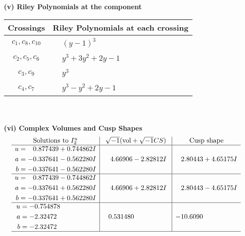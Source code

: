 \documentclass[1p]{elsarticle_modified}
\theoremstyle{definition}
\newcommand{\I}{\sqrt{-1}}
\begin{document}
\newpage\renewcommand{\arraystretch}{1}
\flushleft \textbf{(v) Riley Polynomials at the component}\newline \\
\begin{tabular}{m{50pt}|m{274pt}}
Crossings & \hspace{64pt}Riley Polynomials at each crossing \\
\hline $$\begin{aligned}c_{1},c_{8},c_{10}\end{aligned}$$&$\begin{aligned}
&(y-1)^3
\end{aligned}$\\
\hline $$\begin{aligned}c_{2},c_{5},c_{6}\end{aligned}$$&$\begin{aligned}
&y^3+3 y^2+2 y-1
\end{aligned}$\\
\hline $$\begin{aligned}c_{3},c_{9}\end{aligned}$$&$\begin{aligned}
&y^3
\end{aligned}$\\
\hline $$\begin{aligned}c_{4},c_{7}\end{aligned}$$&$\begin{aligned}
&y^3- y^2+2 y-1
\end{aligned}$\\
\hline
\end{tabular}\\~\\
\newpage\flushleft \textbf{(vi) Complex Volumes and Cusp Shapes}
$$\begin{array}{c|c|c}  
\text{Solutions to }I^u_{2}& \I (\text{vol} + \sqrt{-1}CS) & \text{Cusp shape}\\
 \hline 
\begin{aligned}
u &= \phantom{-}0.877439 + 0.744862 I \\
a &= -0.337641 - 0.562280 I \\
b &= -0.337641 - 0.562280 I\end{aligned}
 & \phantom{-}4.66906 - 2.82812 I & \phantom{-}2.80443 + 4.65175 I \\ \hline\begin{aligned}
u &= \phantom{-}0.877439 - 0.744862 I \\
a &= -0.337641 + 0.562280 I \\
b &= -0.337641 + 0.562280 I\end{aligned}
 & \phantom{-}4.66906 + 2.82812 I & \phantom{-}2.80443 - 4.65175 I \\ \hline\begin{aligned}
u &= -0.754878\phantom{ +0.000000I} \\
a &= -2.32472\phantom{ +0.000000I} \\
b &= -2.32472\phantom{ +0.000000I}\end{aligned}
 & \phantom{-}0.531480\phantom{ +0.000000I} & -10.6090\phantom{ +0.000000I}\\
 \hline 
 \end{array}$$\newpage\newpage\renewcommand{\arraystretch}{1}
\end{document}
